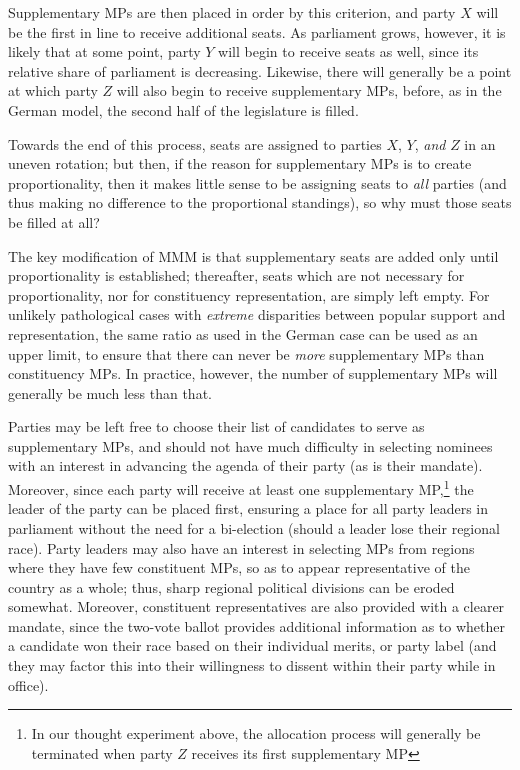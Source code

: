 \documentclass[DIV=calc, paper=a4, fontsize=11pt, twocolumn]{scrartcl}	 %
\begin{document}
Supplementary MPs are then placed in order by this criterion, and party $X$ will be the first in line to receive additional seats. As parliament grows, however, it is likely that at some point, party $Y$ will begin to receive seats as well, since its relative share of parliament is decreasing. Likewise, there will generally be a point at which party $Z$ will also begin to receive supplementary MPs, before, as in the German model, the second half of the legislature is filled. 

Towards the end of this process, seats are assigned to parties $X$, $Y$, \emph{and} $Z$ in an uneven rotation; but then, if the reason for supplementary MPs is to create proportionality, then it makes little sense to be assigning seats to \emph{all} parties (and thus making no difference to the proportional standings), so why must those seats be filled at all?

The key modification of MMM is that supplementary seats are added only until proportionality is established; thereafter, seats which are not necessary for proportionality, nor for constituency representation, are simply left empty. For unlikely pathological cases with \emph{extreme} disparities between popular support and representation, the same ratio as used in the German case can be used as an upper limit, to ensure that there can never be \emph{more} supplementary MPs than constituency MPs. In practice, however, the number of supplementary MPs will generally be much less than that.

Parties may be left free to choose their list of candidates to serve as supplementary MPs, and should not have much difficulty in selecting nominees with an interest in advancing the agenda of their party (as is their mandate). 
Moreover, since each party will receive at least one supplementary MP,\footnote{In our thought experiment above, the allocation process will generally be terminated when party $Z$ receives its first supplementary MP} the leader of the party can be placed first, ensuring a place for all party leaders in parliament without the need for a bi-election (should a leader lose their regional race).
Party leaders may also have an interest in selecting MPs from regions where they have few constituent MPs, so as to appear representative of the country as a whole; thus, sharp regional political divisions can be eroded somewhat.
Moreover, constituent representatives are also provided with a clearer mandate, since the two-vote ballot provides additional information as to whether a candidate won their race based on their individual merits, or party label (and they may factor this into their willingness to dissent within their party while in office).
\end{document}
